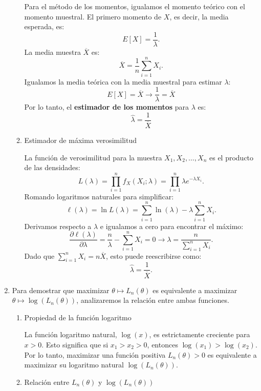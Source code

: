 \begin{enumerate}[label=\color{red}\textbf{\arabic*)}]
\begin{enumerate}[label=\arabic*)]
                Para el método de los momentos, igualamos el momento teórico con el momento muestral. El primero momento de $X$, es decir, la media esperada, es:  \[
                    E[X]=\dfrac{1}{\lambda}.
                \] 
                La media muestra $\overline{X}$ es: \[
                \overline{X}=\dfrac{1}{n}\sum_{i=1}^{n} X_i.
                \] 
                Igualamos la media teórica con la media muestral para estimar $\lambda$:
                \[
                    E[X]=\overline{X}\longrightarrow \dfrac{1}{\lambda}=\overline{X}
                \] 
                Por lo tanto, el \textbf{estimador de los momentos} para $\lambda$ es: \[
                \hat{\lambda}=\dfrac{1}{\overline{X}}
                \]  
            \item Estimador de máxima verosimilitud

                La función de verosimilitud para la muestra $X_1,X_2,\dots,X_n$ es el producto de las densidades: \[
                L(\lambda)=\prod_{i=1}^{n} f_X(X_i;\lambda)=\prod_{i=1}^{n} \lambda e^{-\lambda X_i}.   
                \] 
                Romando logaritmos naturales para simplificar: \[
                \ell(\lambda)=\ln L(\lambda)=\sum_{i=1}^{n} \ln(\lambda)-\lambda \sum_{i=1}^{n} X_i.
                \] 
                Derivamos respecto a $\lambda$ e igualamos a cero para encontrar el máximo: \[
                \frac{\partial \ell(\lambda)}{\partial \lambda} =\dfrac{n}{\lambda}-\sum_{i=1}^{n} X_i=0\longrightarrow \lambda=\dfrac{n}{\sum_{i=1}^{n} X_i}.
                \] 
                Dado que $\sum_{i=1}^{n} X_i=n\overline{X}$, esto puede reescribirse como: \[
                \hat{\lambda}=\dfrac{1}{\overline{X}}.
                \] 
        \end{enumerate}
    \item {} 

        Para demostrar que maximizar $\theta\longmapsto L_n(\theta)$ es equivalente a maximizar $\theta\longmapsto \log(L_n(\theta))$, analizaremos la relación entre ambas funciones.
        \begin{enumerate}[label=\arabic*)]
            \item Propiedad de la función logaritmo

                La función logaritmo natural, $\log(x)$, es estrictamente creciente para $x>0 $. Esto significa que si $x_1>x_2>0$, entonces $\log(x_1)>\log(x_2)$. Por lo tanto, maximizar una función positiva $L_n(\theta)>0$ es equivalente a maximizar su logaritmo natural $\log(L_n(\theta))$.
            \item Relación entre $L_n(\theta)$ y $\log(L_n(\theta))$


\end{enumerate}
\end{enumerate}
